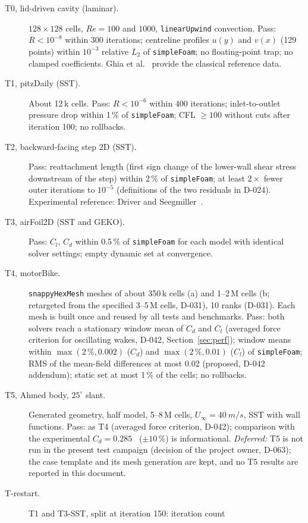 \documentclass[11pt,a4paper]{article}
\newcommand{\code}[1]{\texttt{#1}}
\begin{document}
\begin{description}
\item[T0, lid-driven cavity (laminar).] $128\times128$ cells, $Re=100$ and
  $1000$, \code{linearUpwind} convection. Pass: $R<10^{-8}$ within 300
  iterations; centreline profiles $u(y)$ and $v(x)$ (129 points) within
  $10^{-3}$ relative $L_2$ of \code{simpleFoam}; no floating-point trap; no
  clamped coefficients. Ghia et al.~\cite{Ghia1982} provide the classical
  reference data.
\item[T1, pitzDaily (SST).] About 12\,k cells. Pass: $R<10^{-6}$ within 400
  iterations; inlet-to-outlet pressure drop within 1\,\% of \code{simpleFoam};
  CFL $\ge100$ without cuts after iteration 100; no rollbacks.
\item[T2, backward-facing step 2D (SST).] Pass: reattachment length (first
  sign change of the lower-wall shear stress downstream of the step) within
  2\,\% of \code{simpleFoam}; at least $2\times$ fewer outer iterations to
  $10^{-5}$ (definitions of the two residuals in D-024). Experimental
  reference: Driver and Seegmiller~\cite{Driver1985}.
\item[T3, airFoil2D (SST and GEKO).] Pass: $C_l$, $C_d$ within 0.5\,\% of
  \code{simpleFoam} for each model with identical solver settings; empty
  dynamic set at convergence.
\item[T4, motorBike.] \code{snappyHexMesh} meshes of about 350\,k cells (a)
  and 1--2\,M cells (b; retargeted from the specified 3--5\,M cells,
  D-031), 10 ranks (D-031). Each mesh is built once and reused by all tests and
  benchmarks. Pass: both solvers reach a stationary window mean of $C_d$
  and $C_l$ (averaged force criterion for oscillating wakes, D-042,
  Section~\ref{sec:perf}); window means within $\max(2\,\%,0.002)$ ($C_d$)
  and $\max(2\,\%,0.01)$ ($C_l$) of \code{simpleFoam}; RMS of the
  mean-field differences at most 0.02 (proposed, D-042 addendum); static set
  at most 1\,\% of the cells; no rollbacks.
\item[T5, Ahmed body, $25^\circ$ slant.] Generated geometry, half model,
  5--8\,M cells, $U_\infty=\SI{40}{m/s}$, SST with wall functions. Pass:
  as T4 (averaged force criterion, D-042); comparison with the experimental
  $C_d=0.285$~\cite{Ahmed1984} ($\pm10$\,\%) is informational.
  \emph{Deferred:} T5 is not run in the present test campaign (decision of
  the project owner, D-063); the case template and its mesh generation are
  kept, and no T5 results are reported in this document.
\item[T-restart.] T1 and T3-SST, split at iteration 150: iteration count

\end{description}
\end{document}
